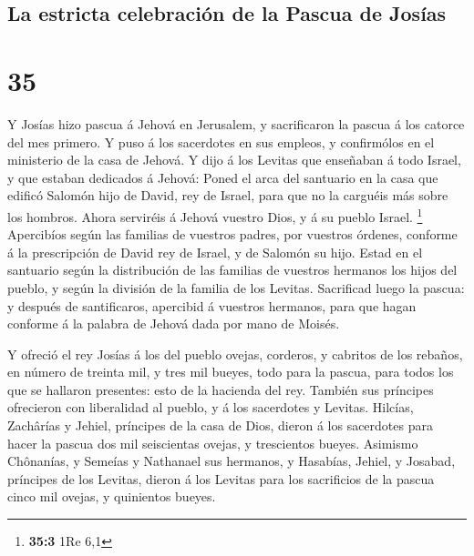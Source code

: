 \hypertarget{la-estricta-celebraciuxf3n-de-la-pascua-de-josuxedas}{%
\subsection{La estricta celebración de la Pascua de
Josías}\label{la-estricta-celebraciuxf3n-de-la-pascua-de-josuxedas}}

\hypertarget{section-34}{%
\section{35}\label{section-34}}

 Y Josías hizo pascua á Jehová en Jerusalem, y
sacrificaron la pascua á los catorce del mes primero.  Y
puso á los sacerdotes en sus empleos, y confirmólos en el ministerio de
la casa de Jehová.  Y dijo á los Levitas que enseñaban á
todo Israel, y que estaban dedicados á Jehová: Poned el arca del
santuario en la casa que edificó Salomón hijo de David, rey de Israel,
para que no la carguéis más sobre los hombros. Ahora serviréis á Jehová
vuestro Dios, y á su pueblo Israel. \footnote{\textbf{35:3} 1Re 6,1}
 Apercibíos según las familias de vuestros padres, por
vuestros órdenes, conforme á la prescripción de David rey de Israel, y
de Salomón su hijo.  Estad en el santuario según la
distribución de las familias de vuestros hermanos los hijos del pueblo,
y según la división de la familia de los Levitas. 
Sacrificad luego la pascua: y después de santificaros, apercibid á
vuestros hermanos, para que hagan conforme á la palabra de Jehová dada
por mano de Moisés.

 Y ofreció el rey Josías á los del pueblo ovejas,
corderos, y cabritos de los rebaños, en número de treinta mil, y tres
mil bueyes, todo para la pascua, para todos los que se hallaron
presentes: esto de la hacienda del rey.  También sus
príncipes ofrecieron con liberalidad al pueblo, y á los sacerdotes y
Levitas. Hilcías, Zachârías y Jehiel, príncipes de la casa de Dios,
dieron á los sacerdotes para hacer la pascua dos mil seiscientas ovejas,
y trescientos bueyes.  Asimismo Chônanías, y Semeías y
Nathanael sus hermanos, y Hasabías, Jehiel, y Josabad, príncipes de los
Levitas, dieron á los Levitas para los sacrificios de la pascua cinco
mil ovejas, y quinientos bueyes.

